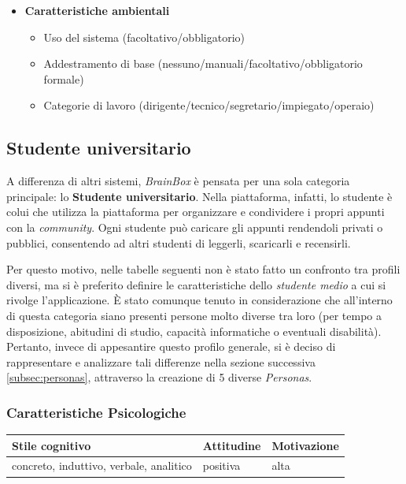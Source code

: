 \begin{itemize}
\begin{itemize}
		      \item Disabilità (visive/uditive/motorie/cognitive/nessuna)
	      \end{itemize}
	\item \textbf{Caratteristiche ambientali}
	      \begin{itemize}
		      \item Uso del sistema (facoltativo/obbligatorio)
		      \item Addestramento di base (nessuno/manuali/facoltativo/obbligatorio formale)
		      \item Categorie di lavoro (dirigente/tecnico/segretario/impiegato/operaio)
	      \end{itemize}
\end{itemize}

\subsection{Studente universitario}
A differenza di altri sistemi, \textit{BrainBox} è pensata per una sola categoria principale: lo \textbf{Studente universitario}. Nella piattaforma, infatti, lo studente è colui che utilizza la piattaforma per organizzare e condividere i propri appunti con la \textit{community}. Ogni studente può caricare gli appunti rendendoli privati o pubblici, consentendo ad altri studenti di leggerli, scaricarli e recensirli.

Per questo motivo, nelle tabelle seguenti non è stato fatto un confronto tra profili diversi, ma si è preferito definire le caratteristiche dello \textit{studente medio} a cui si rivolge l'applicazione. È stato comunque tenuto in considerazione che all'interno di questa categoria siano presenti persone molto diverse tra loro (per tempo a disposizione, abitudini di studio, capacità informatiche o eventuali disabilità). Pertanto, invece di appesantire questo profilo generale, si è deciso di rappresentare e analizzare tali differenze nella sezione successiva \ref{subsec:personas}, attraverso la creazione di 5 diverse \textit{Personas}.

\subsubsection{Caratteristiche Psicologiche}

\begin{table}[h]
	\centering
	\renewcommand{\arraystretch}{1.5}
	\begin{tabular}{|>{\raggedright\arraybackslash}p{5cm}|>{\raggedright\arraybackslash}p{5cm}|>{\raggedright\arraybackslash}p{5cm}|}
		\hline
		\rowcolor{green!30}
		\textbf{Stile cognitivo}                & \textbf{Attitudine} & \textbf{Motivazione} \\
		\hline
		concreto, induttivo, verbale, analitico & positiva            & alta                 \\
		\hline
	\end{tabular}
\end{table}

